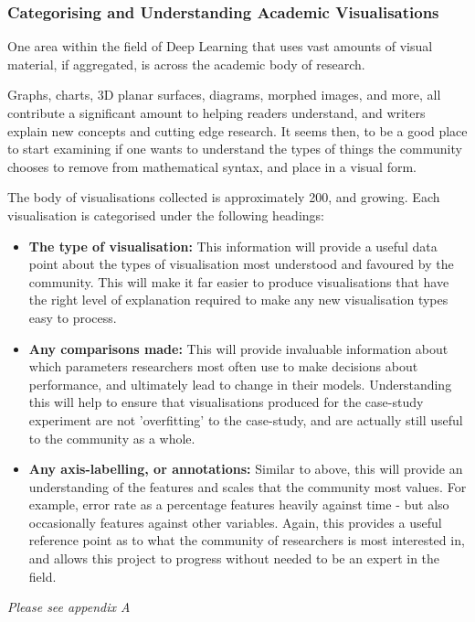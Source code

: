 \documentclass[a4paper,11pt,titlepage]{article}
\begin{document}
		\subsubsection{Categorising and Understanding Academic Visualisations}
		One area within the field of Deep Learning that uses vast amounts of visual material, if aggregated, is across the academic body of research. 
		\par 
		Graphs, charts, 3D planar surfaces, diagrams, morphed images, and more, all contribute a significant amount to helping readers understand, and writers explain new concepts and cutting edge research. It seems then, to be a good place to start examining if one wants to understand the types of things the community chooses to remove from mathematical syntax, and place in a visual form.
		\par	
		The body of visualisations collected is approximately 200, and growing. Each visualisation is categorised under the following headings:
		\begin{itemize}
			\item \textbf{The type of visualisation:} 				This information will provide a useful data point about the types of visualisation most understood and favoured by the community. This will make it far easier to produce visualisations that have the right level of explanation required to make any new visualisation types easy to process.
			\item \textbf{Any comparisons made:} 
			This will provide invaluable information about which parameters researchers most often use to make decisions about performance, and ultimately lead to change in their models. Understanding this will help to ensure that visualisations produced for the case-study experiment are not 'overfitting' to the case-study, and are actually still useful to the community as a whole.
			\item \textbf{Any axis-labelling, or annotations:}
			Similar to above, this will provide an understanding of the features and scales that the community most values. For example, error rate as a percentage features heavily against time - but also occasionally features against other variables. Again, this provides a useful reference point as to what the community of researchers is most interested in, and allows this project to progress without needed to be an expert in the field.
		\end{itemize}
		\textit{Please see appendix A}
		
\end{document}
